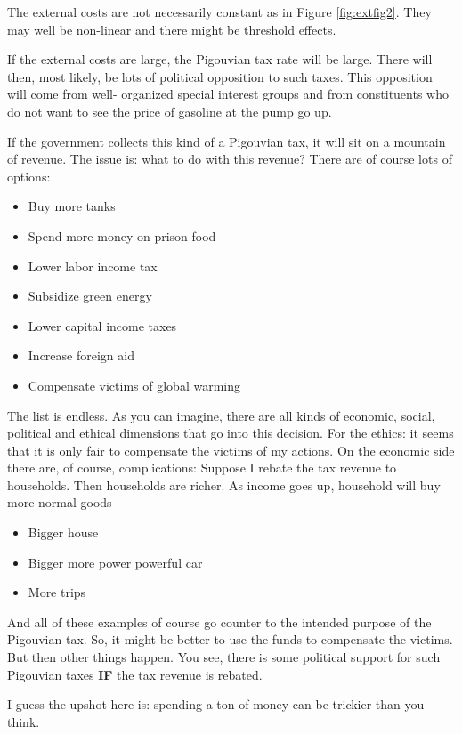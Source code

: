 \documentclass[
]{book}
\providecommand{\tightlist}{%
  \setlength{\itemsep}{0pt}\setlength{\parskip}{0pt}}
\begin{document}
The external costs are not necessarily constant as in Figure \ref{fig:extfig2}. They may well be non-linear and there might be threshold effects.

If the external costs are large, the Pigouvian tax rate will be large. There will then, most likely, be lots of political opposition to such taxes. This opposition will come from well- organized special interest groups and from constituents who do not want to see the price of gasoline at the pump go up.

If the government collects this kind of a Pigouvian tax, it will sit on a mountain of revenue. The issue is: what to do with this revenue? There are of course lots of options:

\begin{itemize}
\tightlist
\item
  Buy more tanks
\item
  Spend more money on prison food
\item
  Lower labor income tax
\item
  Subsidize green energy
\item
  Lower capital income taxes
\item
  Increase foreign aid
\item
  Compensate victims of global warming
\end{itemize}

The list is endless. As you can imagine, there are all kinds of economic, social, political and ethical dimensions that go into this decision. For the ethics: it seems that it is only fair to compensate the victims of my actions. On the economic side there are, of course, complications: Suppose I rebate the tax revenue to households. Then households are richer. As income goes up, household will buy more normal goods

\begin{itemize}
\tightlist
\item
  Bigger house
\item
  Bigger more power powerful car
\item
  More trips
\end{itemize}

And all of these examples of course go counter to the intended purpose of the Pigouvian tax. So, it might be better to use the funds to compensate the victims. But then other things happen. You see, there is some political support for such Pigouvian taxes \textbf{IF} the tax revenue is rebated.

I guess the upshot here is: spending a ton of money can be trickier than you think.
\end{document}

